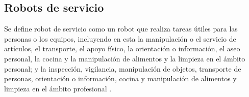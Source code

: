 \subsection{Robots de servicio}
\label{sec:robot_servicio}

Se define robot de servicio como un robot que realiza tareas útiles para las personas o los equipos, incluyendo en esta la manipulación o el servicio de artículos, el transporte, el apoyo físico, la orientación o información, el aseo personal, la cocina y la manipulación de alimentos y la limpieza en el ámbito personal; y la inspección, vigilancia, manipulación de objetos, transporte de personas, orientación o información, cocina y manipulación de alimentos y limpieza en el ámbito profesional \cite{ISO8373}.\\


     

